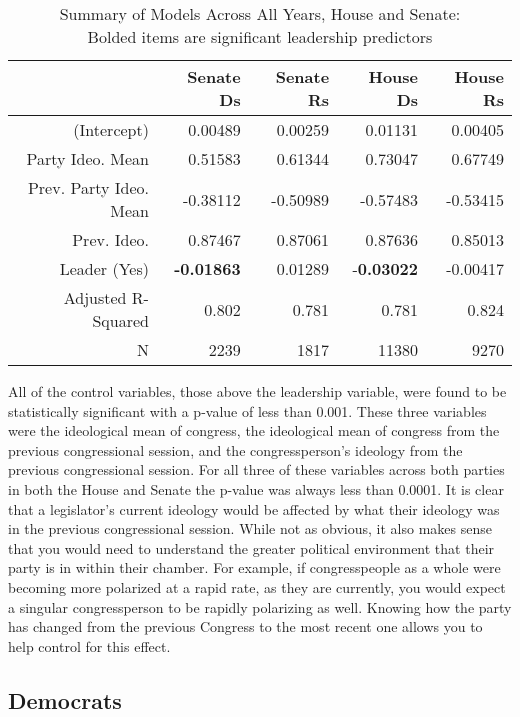 \documentclass[12pt,twoside]{reedthesis}
\begin{document}
  \begin{table}[h]
  \centering
  \caption[Summary of Models Across All Years, House and Senate]{Summary of Models Across All Years, House and Senate: \\ Bolded items are significant leadership predictors}
  \begin{tabular}{r|rrrr}
                         & Senate Ds & Senate Rs & House Ds & House Rs \\ \hline
  (Intercept)            & 0.00489   & 0.00259   & 0.01131  & 0.00405  \\
  Party Ideo. Mean       & 0.51583   & 0.61344   & 0.73047  & 0.67749  \\
  Prev. Party Ideo. Mean & -0.38112  & -0.50989  & -0.57483 & -0.53415 \\
  Prev. Ideo.            & 0.87467   & 0.87061   & 0.87636  & 0.85013  \\ \hline
  Leader (Yes)           & \textbf{-0.01863}  & 0.01289   & -\textbf{0.03022} & -0.00417 \\ \hline
  Adjusted R-Squared     & 0.802     & 0.781     & 0.781    & 0.824    \\
  N                      & 2239      & 1817      & 11380    & 9270    
  \end{tabular}
  \end{table}
  
  All of the control variables, those above the leadership variable, were
  found to be statistically significant with a p-value of less than 0.001.
  These three variables were the ideological mean of congress, the
  ideological mean of congress from the previous congressional session,
  and the congressperson's ideology from the previous congressional
  session. For all three of these variables across both parties in both
  the House and Senate the p-value was always less than 0.0001. It is
  clear that a legislator's current ideology would be affected by what
  their ideology was in the previous congressional session. While not as
  obvious, it also makes sense that you would need to understand the
  greater political environment that their party is in within their
  chamber. For example, if congresspeople as a whole were becoming more
  polarized at a rapid rate, as they are currently, you would expect a
  singular congressperson to be rapidly polarizing as well. Knowing how
  the party has changed from the previous Congress to the most recent one
  allows you to help control for this effect.
  
  \subsection{Democrats}\label{democrats}
  
\end{document}
